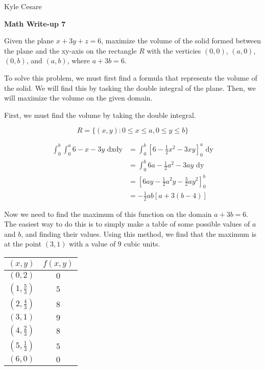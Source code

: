 \documentclass[11pt]{article}
\begin{document}
\begin{flushright}
  Kyle Cesare
\end{flushright}

{\center \textbf{Math Write-up 7} \\}

Given the plane $x + 3y + z = 6$, maximize the volume of the solid formed
between the plane and the xy-axis on the rectangle $R$ with the verticies $(0,
0)$, $(a, 0)$, $(0, b)$, and $(a, b)$, where $a + 3b = 6$.

\vspace{8mm}

To solve this problem, we must first find a formula that represents the volume
of the solid.  We will find this by tasking the double integral of the plane.
Then, we will maximize the volume on the given domain.

\vspace{2mm}

First, we must find the volume by taking the double integral.

$$
  R = \{ (x, y) : 0 \le x \le a, 0 \le y \le b \}
$$

\begin{align*}
  \int_0^b \int_0^a 6 - x - 3y \text{ dxdy}
    &= \int_0^b \left[ 6 - \frac{1}{2}x^2 - 3xy \right]_0^a \text{ dy} \\
    &= \int_0^b 6a - \frac{1}{2}a^2 - 3ay \text{ dy} \\
    &= \left[ 6ay - \frac{1}{2}a^2y - \frac{3}{2}ay^2 \right]_0^b \\
    &= -\frac{1}{2}ab \left[ a+3(b-4) \right]
\end{align*}

Now we need to find the maximum of this function on the domain $a + 3b = 6$.
The easiest way to do this is to simply make a table of some possible values of
$a$ and $b$, and finding their values.  Using this method, we find that the
maximum is at the point $(3, 1)$ with a value of $9$ cubic units.

\vspace{0.8mm}

\begin{center}
\begin{tabular}{ | c | c | }
  \hline
  $(x, y)$           & $f(x, y)$ \\
  \hline
  $(0, 2)$           & $0$ \\
  $(1, \frac{5}{3})$ & $5$ \\
  $(2, \frac{4}{3})$ & $8$ \\
  $(3, 1)$           & $9$ \\
  $(4, \frac{2}{3})$ & $8$ \\
  $(5, \frac{1}{3})$ & $5$ \\
  $(6, 0)$           & $0$ \\
  \hline
\end{tabular}
\end{center}
\end{document}
